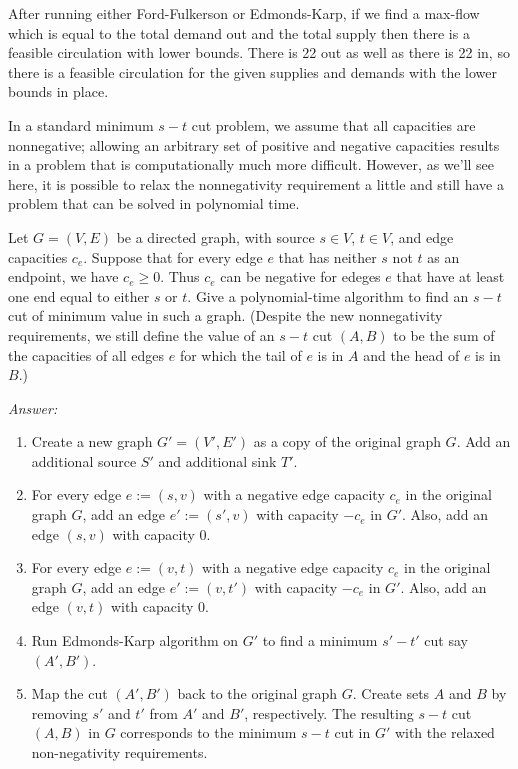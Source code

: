 \documentclass[12pt]{article}
\newenvironment{problem}[2][Problem]{\begin{trivlist}
\item[\hskip \labelsep {\bfseries #1}\hskip \labelsep {\bfseries #2.}]}{\end{trivlist}}
\begin{document}
After running either Ford-Fulkerson or Edmonds-Karp, if we find a max-flow which is equal to the total demand out and the total supply then there is a feasible circulation with lower bounds. There is 22 out as well as there is 22 in, so there is a feasible circulation for the given supplies and demands with the lower bounds in place.

\begin{problem}{2}
    In a standard minimum $s-t$ cut problem, we assume that all capacities are nonnegative; allowing an arbitrary set of positive and negative capacities results in a problem that is computationally much more difficult. However, as we'll see here, it is possible to relax the nonnegativity requirement a little and still have a problem that can be solved in polynomial time.

    Let $G=(V,E)$ be a directed graph, with source $s \in V$, $t \in V$, and edge capacities ${c_e}$. Suppose that for every edge $e$ that has neither $s$ not $t$ as an endpoint, we have $c_e \geq 0$. Thus $c_e$ can be negative for edeges $e$ that have at least one end equal to either $s$ or $t$. Give a polynomial-time algorithm to find an $s-t$ cut of minimum value in such a graph. (Despite the new nonnegativity requirements, we still define the value of an $s-t$ cut $(A,B)$ to be the sum of the capacities of all edges $e$ for which the tail of $e$ is in $A$ and the head of $e$ is in $B$.)
\end{problem}

\textit{Answer:}

\begin{enumerate}[1.]
    \item Create a new graph $G'=(V', E')$ as a copy of the original graph $G$. Add an additional source $S'$ and additional sink $T'$.
    \item For every edge $e:=(s,v)$ with a negative edge capacity $c_e$ in the original graph $G$, add an edge $e':=(s',v)$ with capacity $-c_e$ in $G'$. Also, add an edge $(s,v)$ with capacity 0.
    \item For every edge $e:=(v,t)$ with a negative edge capacity $c_e$ in the original graph $G$, add an edge $e':=(v,t')$ with capacity $-c_e$ in $G'$. Also, add an edge $(v,t)$ with capacity 0.
    \item Run Edmonds-Karp algorithm on $G'$ to find a minimum $s'-t'$ cut say $(A', B')$.
    \item Map the cut $(A', B')$ back to the original graph $G$. Create sets $A$ and $B$ by removing $s'$ and $t'$ from $A'$ and $B'$, respectively. The resulting $s-t$ cut $(A, B)$ in $G$ corresponds to the minimum $s-t$ cut in $G'$ with the relaxed non-negativity requirements.
\end{enumerate}
\end{document}
